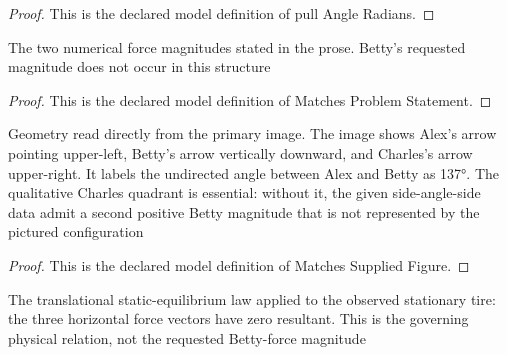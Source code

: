 \begin{proof}
  This is the declared model definition of pull Angle Radians.
\end{proof}
\begin{definition}
  \label{def:physics:phyx-mini-0756:phyxminiproblems-problemphyxmini0756-matchesproblemstatement}
  The two numerical force magnitudes stated in the prose. Betty's requested magnitude does not occur in this structure
\end{definition}
\begin{proof}
  This is the declared model definition of Matches Problem Statement.
\end{proof}
\begin{definition}
  \label{def:physics:phyx-mini-0756:phyxminiproblems-problemphyxmini0756-matchessuppliedfigure}
  Geometry read directly from the primary image. The image shows Alex's arrow pointing upper-left, Betty's arrow vertically downward, and Charles's arrow upper-right. It labels the undirected angle between Alex and Betty as 137°. The qualitative Charles quadrant is essential: without it, the given side-angle-side data admit a second positive Betty magnitude that is not represented by the pictured configuration
\end{definition}
\begin{proof}
  This is the declared model definition of Matches Supplied Figure.
\end{proof}
\begin{definition}
  \label{def:physics:phyx-mini-0756:phyxminiproblems-problemphyxmini0756-satisfiesstationaryforcebalance}
  The translational static-equilibrium law applied to the observed stationary tire: the three horizontal force vectors have zero resultant. This is the governing physical relation, not the requested Betty-force magnitude
\end{definition}
